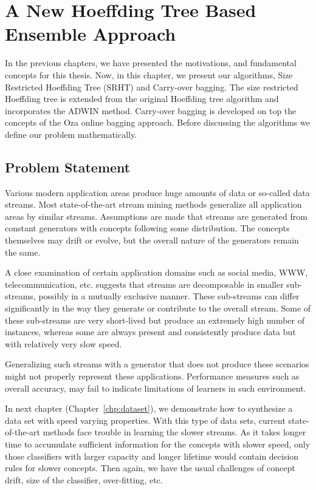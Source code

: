 \chapter{A New Hoeffding Tree Based Ensemble Approach}
\label{chp:algo}
In the previous chapters, we have presented the motivations, and fundamental concepts for this thesis. Now, in this chapter, we present our algorithms, Size Restricted Hoeffding Tree (SRHT) and Carry-over bagging. The size restricted Hoeffding tree is extended from the original Hoeffding tree algorithm and incorporates the ADWIN method. Carry-over bagging is developed on top the concepts of the Oza online bagging approach. 
Before discussing the algorithms we define our problem mathematically. 

\section{Problem Statement}
Various modern application areas produce huge amounts of data or so-called data streams. Most state-of-the-art stream mining methods generalize all application areas by similar streams. Assumptions are made that streams are generated from constant generators with concepts following some distribution. The concepts themselves may drift or evolve, but the overall nature of the generators remain the same.

A close examination of certain application domains such as social media, WWW, telecommunication, etc. suggests that streams are decomposable in smaller sub-streams, possibly in a mutually exclusive manner. These sub-streams  can differ significantly in the way they generate or contribute to the overall stream. Some of these sub-streams are very short-lived but produce an extremely high number of instances, whereas some are always present and consistently produce data but with relatively very slow speed.

Generalizing such streams with a generator that does not produce these scenarios might not properly represent these applications. Performance measures such as overall accuracy, may fail to indicate limitations of learners in such environment.

In next chapter (Chapter~\ref{chp:dataset}), we demonstrate how to synthesize a data set with speed varying properties. With this type of data sets, current state-of-the-art methods face trouble in learning the slower streams. As it takes longer time to accumulate sufficient information for the concepts with slower speed, only those classifiers with larger capacity and longer lifetime would contain decision rules for slower concepts. Then again, we have the usual challenges of concept drift, size of the classifier, over-fitting, etc.

